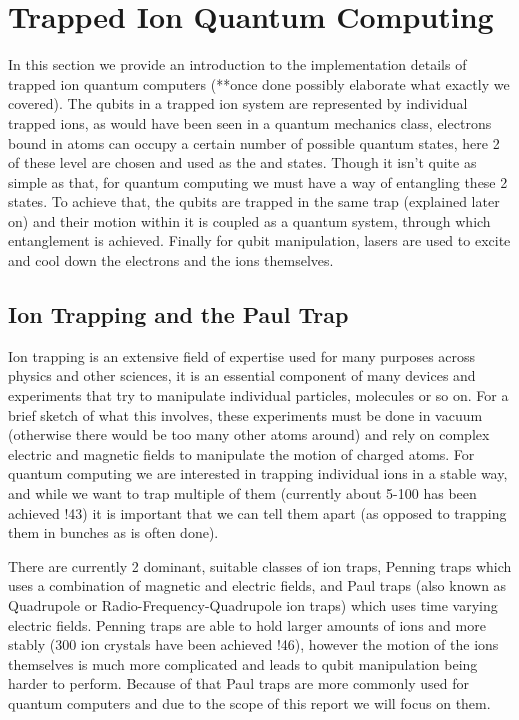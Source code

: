 
\section{Trapped Ion Quantum Computing} \label{sec:Trapped}
In this section we provide an introduction to the implementation details of trapped ion quantum computers (**once done possibly elaborate what exactly we covered).
The qubits in a trapped ion system are represented by individual trapped ions, as would have been seen in a quantum mechanics class, electrons bound in atoms can occupy a certain number of possible quantum states, here 2 of these level are chosen and used as the \kz and \ko states.
Though it isn't quite as simple as that, for quantum computing we must have a way of entangling these 2 states.
To achieve that, the qubits are trapped in the same trap (explained later on) and their motion within it is coupled as a quantum system, through which entanglement is achieved.
Finally for qubit manipulation, lasers are used to excite and cool down the electrons and the ions themselves.

\subsection{Ion Trapping and the Paul Trap}
Ion trapping is an extensive field of expertise used for many purposes across physics and other sciences, it is an essential component of many devices and experiments that try to manipulate individual particles, molecules or so on.
For a brief sketch of what this involves, these experiments must be done in vacuum (otherwise there would be too many other atoms around) and rely on complex electric and magnetic fields to manipulate the motion of charged atoms.
For quantum computing we are interested in trapping individual ions in a stable way, and while we want to trap multiple of them (currently about 5-100 has been achieved !43) it is important that we can tell them apart (as opposed to trapping them in bunches as is often done).

There are currently 2 dominant, suitable classes of ion traps, Penning traps which uses a combination of magnetic and electric fields, and Paul traps (also known as Quadrupole or Radio-Frequency-Quadrupole ion traps) which uses time varying electric fields.
Penning traps are able to hold larger amounts of ions and more stably (300 ion crystals have been achieved !46), however the motion of the ions themselves is much more complicated and leads to qubit manipulation being harder to perform.
Because of that Paul traps are more commonly used for quantum computers and due to the scope of this report we will focus on them.

